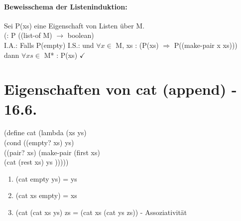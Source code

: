 \documentclass[a4paper, 20pt, openany]{book}
\begin{document}
 \subsubsection{Beweisschema der Listeninduktion:}
Sei P(xs) eine Eigenschaft von Listen über M.\\
(: P ((list-of M) $\rightarrow$ boolean)\\
I.A.: Falls P(empty)
I.S.: und $\forall x \in$ M, xs : (P(xs) $\Rightarrow$ P((make-pair x xs)))\\
dann $\forall xs \in$ M* : P(xs) $\checkmark$

\chapter{ Eigenschaften von cat (append) - 16.6.}
(define cat (lambda (xs ys)\\
(cond ((empty? xs) ys)\\
((pair? xs) (make-pair (first xs)\\
(cat (rest xs) ys )))))\\

\begin{enumerate}
\item (cat empty ys) = ys
\item (cat xs empty) = xs
\item (cat (cat xs ys) zs = (cat xs (cat ys zs)) - Assoziativität
\end{enumerate}
\end{document}
